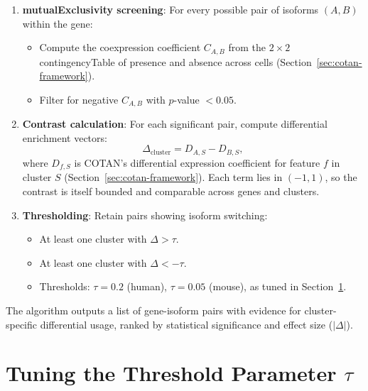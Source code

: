 \begin{enumerate}
    \item \textbf{\gls{mutualExclusivity} screening}: For every possible pair of isoforms $(A, B)$ within the gene:
    \begin{itemize}
        \item Compute the \gls{coexpression} coefficient $C_{A,B}$ from the $2 \times 2$ \gls{contingencyTable} of presence and absence across cells\cite{galfre2021cotan} (Section~\ref{sec:cotan-framework}).
        \item Filter for negative $C_{A,B}$ with $p$-value $< 0.05$.
    \end{itemize}
    
    \item \textbf{Contrast calculation}: For each significant pair, compute differential enrichment vectors:
    \begin{equation}
        \Delta_{\text{cluster}} = D_{A,S} - D_{B,S},
    \end{equation}
    where $D_{f,S}$ is COTAN's differential expression coefficient for feature $f$ in cluster $S$ (Section~\ref{sec:cotan-framework}). Each term lies in $(-1,1)$, so the contrast is itself bounded and comparable across genes and clusters.
    
    \item \textbf{Thresholding}: Retain pairs showing isoform switching:
    \begin{itemize}
        \item At least one cluster with $\Delta > \tau$.
        \item At least one cluster with $\Delta < -\tau$.
        \item Thresholds: $\tau = 0.2$ (human), $\tau = 0.05$ (mouse), as tuned in Section~\ref{sec:tuning-tau}.
    \end{itemize}
\end{enumerate}

The algorithm outputs a list of gene-isoform pairs with evidence for cluster-specific differential usage, ranked by statistical significance and effect size ($|\Delta|$).

\section{Tuning the Threshold Parameter \texorpdfstring{$\tau$}{tau}}\label{sec:tuning-tau}

